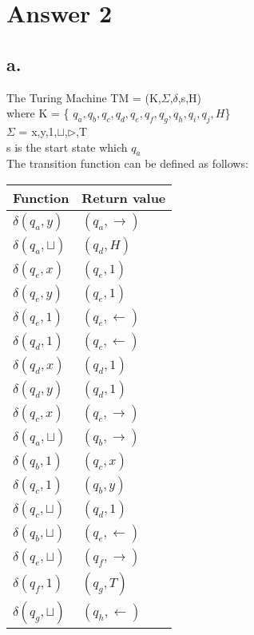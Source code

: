 \documentclass[12pt]{article}
\begin{document}
\section*{Answer 2}

\subsection*{a.}
The Turing Machine TM = (K,$\Sigma$,$\delta$,s,H)\\
where K = \{ $q_a,q_b,q_c,q_d,q_e,q_f,q_g,q_h,q_i,q_j,H$\}\\
$\Sigma$ = {x,y,1,$\sqcup$,$\triangleright$,T}\\
s is the start state which $q_a$\\
The transition function can be defined as follows:\\
\begin{table}[H]
\centering
\begin{tabular}{|l|l|}
\hline
Function             & Return value        \\ \hline
$\delta(q_a,y)$      & $(q_a,\rightarrow)$ \\ \hline
$\delta(q_a,\sqcup)$ & $(q_d,H)$           \\ \hline
$\delta(q_e,x)$      & $(q_e,1)$           \\ \hline
$\delta(q_e,y)$      & $(q_e,1)$           \\ \hline
$\delta(q_e,1)$      & $(q_e,\leftarrow)$  \\ \hline
$\delta(q_d,1)$      & $(q_c,\leftarrow)$  \\ \hline
$\delta(q_d,x)$      & $(q_d,1)$           \\ \hline
$\delta(q_d,y)$      & $(q_d,1)$           \\ \hline
$\delta(q_c,x)$      & $(q_c,\rightarrow)$ \\ \hline
$\delta(q_a,\sqcup)$ & $(q_b,\rightarrow)$ \\ \hline
$\delta(q_b,1)$      & $(q_c,x)$           \\ \hline
$\delta(q_c,1)$      & $(q_b,y)$           \\ \hline
$\delta(q_c,\sqcup)$ & $(q_d,1)$           \\ \hline
$\delta(q_b,\sqcup)$ & $(q_e,\leftarrow)$  \\ \hline
$\delta(q_e,\sqcup)$ & $(q_f,\rightarrow)$ \\ \hline
$\delta(q_f,1)$      & $(q_g,T)$           \\ \hline
$\delta(q_g,\sqcup)$ & $(q_h,\leftarrow)$  \\ \hline

\end{tabular}
\end{table}
\end{document}
